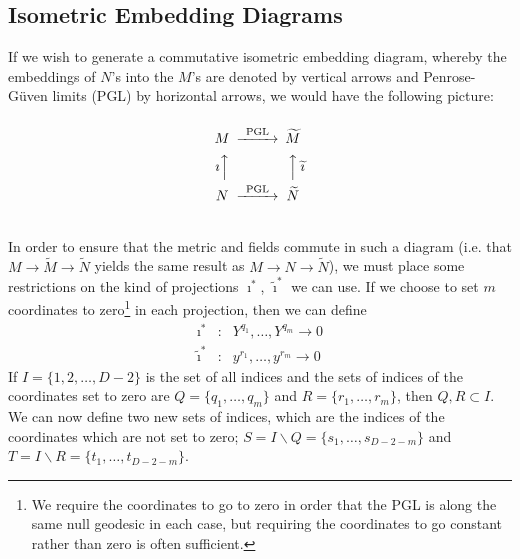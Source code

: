 \documentclass[11pt, a4paper, titlepage]{article}
\begin{document}
\subsection{Isometric Embedding Diagrams}
If we wish to generate a commutative isometric embedding diagram, whereby the
embeddings of $N$'s into the $M$'s are denoted by vertical arrows and
Penrose-G\"{u}ven limits (PGL) by horizontal arrows, we would have the following
picture:
\begin{equation}
  \label{eq:bpg:ie:generic}
  \begin{CD}
    @.\\
    M @>\text{PGL}>>                      \widetilde{M}\\
    \text{$\imath$}@AAA @AAA\text{$\widetilde{\imath}$}\\
    N @>\text{PGL}>>                      \widetilde{N}\\
    @.
  \end{CD}
\end{equation}
In order to ensure that the metric and fields commute in such a diagram (i.e.
that $M\rightarrow \widetilde{M} \rightarrow \widetilde{N}$ yields the same
result as $M\rightarrow N\rightarrow\widetilde{N}$), we must place some
restrictions on the kind of projections $\imath^*$, $\widetilde{\imath}^*$ we
can use. If we choose to set $m$ coordinates to zero\footnote{We require the
  coordinates to go to zero in order that the PGL is along the same null
  geodesic in each case, but requiring the coordinates to go constant rather
  than zero is often sufficient.} in each projection, then we can define
\begin{eqnarray}
  \label{eq:bpg:ie:i1}
  \imath^*&:& Y^{q_1},\ldots,Y^{q_m} \rightarrow 0\\
  \label{eq:bpg:ie:i2}
  \widetilde{\imath}^*&:& y^{r_1},\ldots,y^{r_m} \rightarrow 0
\end{eqnarray}
If $I=\{1,2,\ldots,D-2\}$ is the set of all indices and the sets of indices of
the coordinates set to zero are $Q=\{q_1,\ldots,q_m\}$ and
$R=\{r_1,\ldots,r_m\}$, then $Q,R\subset I$. We can now define two new sets of
indices, which are the indices of the coordinates which are not set to zero;
$S=I\backslash Q=\{s_1,\ldots,s_{D-2-m}\}$ and $T=I\backslash
R=\{t_1,\ldots,t_{D-2-m}\}$.
\end{document}
